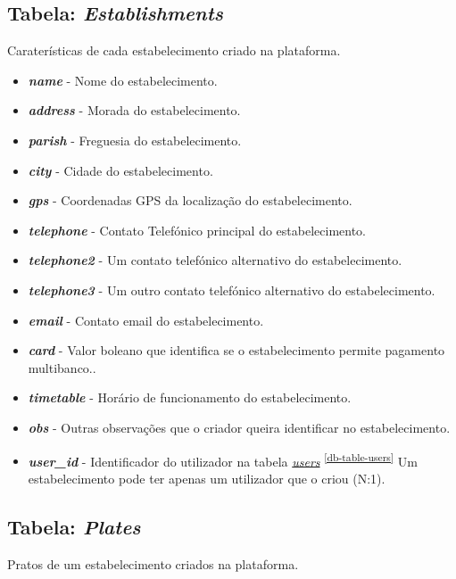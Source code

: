 \documentclass[11pt, a4paper, sans]{article}
\begin{document}
	\subsection{Tabela: \textit{Establishments}} \label{db-table-establishments}

	Caraterísticas de cada estabelecimento criado na plataforma.

	\begin{itemize}
		\item \textbf{\textit{name}} - Nome do estabelecimento.
		\item \textbf{\textit{address}} - Morada do estabelecimento.
		\item \textbf{\textit{parish}} - Freguesia do estabelecimento.
		\item \textbf{\textit{city}} - Cidade do estabelecimento.
		\item \textbf{\textit{gps}} - Coordenadas GPS da localização do estabelecimento.
		\item \textbf{\textit{telephone}} - Contato Telefónico principal do estabelecimento.
		\item \textbf{\textit{telephone2}} - Um contato telefónico alternativo do estabelecimento.
		\item \textbf{\textit{telephone3}} - Um outro contato telefónico alternativo do estabelecimento.
		\item \textbf{\textit{email}} - Contato email do estabelecimento.
		\item \textbf{\textit{card}} - Valor boleano que identifica se o estabelecimento permite pagamento
			multibanco..
		\item \textbf{\textit{timetable}} - Horário de funcionamento do estabelecimento.
		\item \textbf{\textit{obs}} - Outras observações que o criador queira identificar no estabelecimento.
		\item \textbf{\textit{user\_id}} - Identificador do utilizador na tabela 
			\underline{\textit{users}} \textsuperscript{\ref{db-table-users}} 
			Um estabelecimento pode ter apenas um utilizador que o criou (N:1).
	\end{itemize}

	\subsection{Tabela: \textit{Plates}} \label{db-table-plates}

	Pratos de um estabelecimento criados na plataforma.
\end{document}
